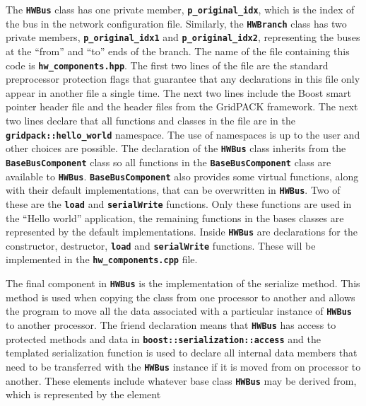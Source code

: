 The \texttt{\textbf{HWBus}} class has one private member, \texttt{\textbf{p\_original\_idx}}, which is the index of the bus in the network configuration file. Similarly, the \texttt{\textbf{HWBranch}} class has two private members, \texttt{\textbf{p\_original\_idx1}} and \texttt{\textbf{p\_original\_idx2}}, representing the buses at the ``from'' and ``to'' ends of the branch. The name of the file containing this code is \texttt{\textbf{hw\_components.hpp}}. The first two lines of the file are the standard preprocessor protection flags that guarantee that any declarations in this file only appear in another file a single time. The next two lines include the Boost smart pointer header file and the header files from the GridPACK framework. The next two lines declare that all functions and classes in the file are in the \texttt{\textbf{gridpack::hello\_world}} namespace. The use of namespaces is up to the user and other choices are possible. The declaration of the \texttt{\textbf{HWBus}} class inherits from the \texttt{\textbf{BaseBusComponent}} class so all functions in the \texttt{\textbf{BaseBusComponent}} class are available to \texttt{\textbf{HWBus}}. \texttt{\textbf{BaseBusComponent}} also provides some virtual functions, along with their default implementations, that can be overwritten in \texttt{\textbf{HWBus}}. Two of these are the \texttt{\textbf{load}} and \texttt{\textbf{serialWrite}} functions. Only these functions are used in the ``Hello world'' application, the remaining functions in the bases classes are represented by the default implementations. Inside \texttt{\textbf{HWBus}} are declarations for the constructor, destructor, \texttt{\textbf{load}} and \texttt{\textbf{serialWrite}} functions. These will be implemented in the \texttt{\textbf{hw\_components.cpp}} file.

The final component in \texttt{\textbf{HWBus}} is the implementation of the serialize method. This method is used when copying the class from one processor to another and allows the program to move all the data associated with a particular instance of \texttt{\textbf{HWBus}} to another processor. The friend declaration means that \texttt{\textbf{HWBus}} has access to protected methods and data in \texttt{\textbf{boost::serialization::access}} and the templated serialization function is used to declare all internal data members that need to be transferred with the \texttt{\textbf{HWBus}} instance if it is moved from on processor to another. These elements include whatever base class \texttt{\textbf{HWBus}} may be derived from, which is represented by the element

